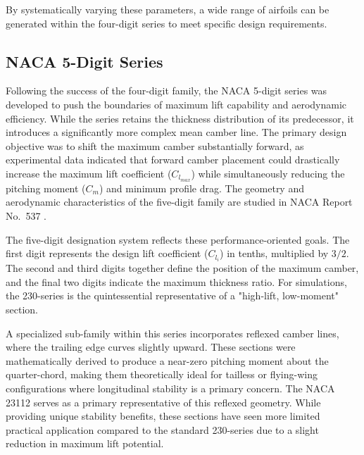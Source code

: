 By systematically varying these parameters, 
a wide range of airfoils can be generated within the four-digit series 
to meet specific design requirements.


\subsection*{NACA 5-Digit Series}

Following the success of the four-digit family, 
the NACA 5-digit series was developed to push the boundaries of maximum lift capability and aerodynamic efficiency. 
While the series retains the thickness distribution of its predecessor, 
it introduces a significantly more complex mean camber line. 
The primary design objective was to shift the maximum camber substantially forward, 
as experimental data indicated that forward camber placement could drastically increase the maximum lift coefficient ($C_{l_{max}}$) while simultaneously reducing the pitching moment ($C_m$) and minimum profile drag. 
The geometry and aerodynamic characteristics of the five-digit family are studied in NACA Report No.~537 \cite{NACA_TR_537}.

The five-digit designation system reflects these performance-oriented goals. 
The first digit represents the design lift coefficient ($C_{l_i}$) in tenths, multiplied by $3/2$. 
The second and third digits together define the position of the maximum camber, and the final two digits indicate the maximum thickness ratio. 
For simulations, 
the 230-series is the quintessential representative of a "high-lift, low-moment" section.

A specialized sub-family within this series incorporates reflexed camber lines, where the trailing edge curves slightly upward. 
These sections were mathematically derived to produce a near-zero pitching moment about the quarter-chord, 
making them theoretically ideal for tailless or flying-wing configurations where longitudinal stability is a primary concern. 
The NACA 23112 serves as a primary representative of this reflexed geometry. While providing unique stability benefits, 
these sections have seen more limited practical application compared to the standard 230-series due to a slight reduction in maximum lift potential.


